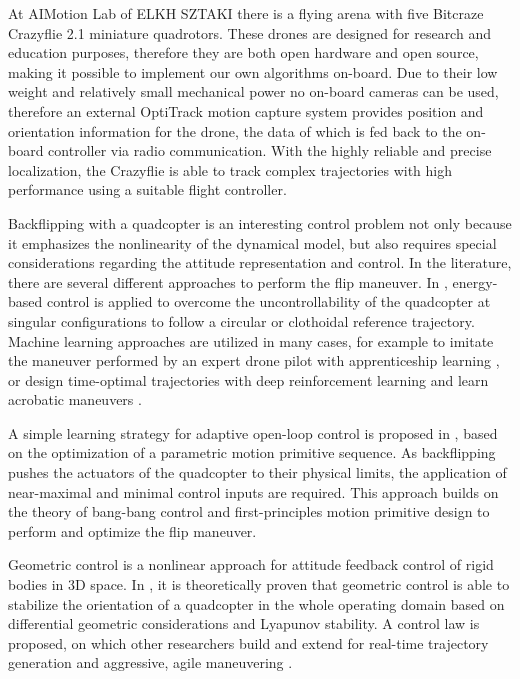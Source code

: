 At AIMotion Lab of ELKH SZTAKI there is a flying arena with five Bitcraze Crazyflie 2.1 miniature quadrotors. These drones are designed for research and education purposes, therefore they are both open hardware and open source, making it possible to implement our own algorithms on-board. Due to their low weight and relatively small mechanical power no on-board cameras can be used, therefore an external OptiTrack motion capture system provides position and orientation information for the drone, the data of which is fed back to the on-board controller via radio communication. With the highly reliable and precise localization, the Crazyflie is able to track complex trajectories with high performance using a suitable flight controller.

Backflipping with a quadcopter is an interesting control problem not only because it emphasizes the nonlinearity of the dynamical model, but also requires special considerations regarding the attitude representation and control. In the literature, there are several different approaches to perform the flip maneuver. In \cite{energy-quaternion}, energy-based control is applied to overcome the uncontrollability of the quadcopter at singular configurations to follow a circular or clothoidal reference trajectory. Machine learning approaches are utilized in many cases, for example to imitate the maneuver performed by an expert drone pilot with apprenticeship learning \cite{abbeel2010}, or design time-optimal trajectories with deep reinforcement learning \cite{drone-racing-deep-rl} and learn acrobatic maneuvers \cite{deep_acrobatics, quadrotor-control-rl}. 

A simple learning strategy for adaptive open-loop control is proposed in \cite{LSICRA2010}, based on the optimization of a parametric motion primitive sequence. As backflipping pushes the actuators of the quadcopter to their physical limits, the application of near-maximal and minimal control inputs are required. This approach builds on the theory of bang-bang control and first-principles motion primitive design to perform and optimize the flip maneuver. 

Geometric control is a nonlinear approach for attitude feedback control of rigid bodies in 3D space. In \cite{lelemc2010}, it is theoretically proven that geometric control is able to stabilize the orientation of a quadcopter in the whole operating domain based on differential geometric considerations and Lyapunov stability. A control law is proposed, on which other researchers build and extend for real-time trajectory generation and aggressive, agile maneuvering \cite{turpinkumar2011, mellinger2011} .

